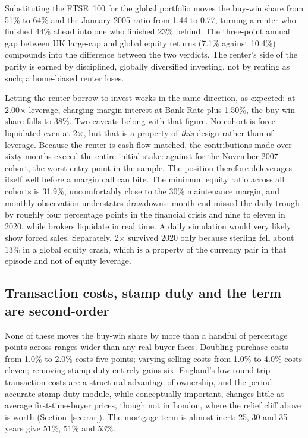 Substituting the FTSE~100 for the global portfolio moves the buy-win share from 51\% to 64\% and the January 2005 ratio from 1.44 to 0.77, turning a renter who finished 44\% ahead into one who finished 23\% behind. The three-point annual gap between UK large-cap and global equity returns (7.1\% against 10.4\%) compounds into the difference between the two verdicts. The renter's side of the parity is earned by disciplined, globally diversified investing, not by renting as such; a home-biased renter loses.

Letting the renter borrow to invest works in the same direction, as expected: at 2.00$\times$ leverage, charging margin interest at Bank Rate plus 1.50\%, the buy-win share falls to 38\%. Two caveats belong with that figure. No cohort is force-liquidated even at 2$\times$, but that is a property of \emph{this} design rather than of leverage. Because the renter is cash-flow matched, the contributions made over sixty months exceed the entire initial stake:  against  for the November 2007 cohort, the worst entry point in the sample. The position therefore deleverages itself well before a margin call can bite. The minimum equity ratio across all cohorts is 31.9\%, uncomfortably close to the 30\% maintenance margin, and monthly observation understates drawdowns: month-end missed the daily trough by roughly four percentage points in the financial crisis and nine to eleven in 2020, while brokers liquidate in real time. A daily simulation would very likely show forced sales. Separately, 2$\times$ survived 2020 only because sterling fell about 13\% in a global equity crash, which is a property of the currency pair in that episode and not of equity leverage.

\subsection{Transaction costs, stamp duty and the term are second-order}

None of these moves the buy-win share by more than a handful of percentage points across ranges wider than any real buyer faces. Doubling purchase costs from 1.0\% to 2.0\% costs five points; varying selling costs from 1.0\% to 4.0\% costs eleven; removing stamp duty entirely gains six. England's low round-trip transaction costs are a structural advantage of ownership, and the period-accurate stamp-duty module, while conceptually important, changes little at average first-time-buyer prices, though not in London, where the relief cliff above  is worth  (Section~\ref{sec:rar}). The mortgage term is almost inert: 25, 30 and 35 years give 51\%, 51\% and 53\%.

